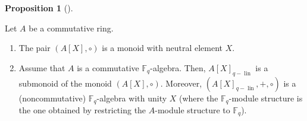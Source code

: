 \documentclass[numbers=enddot,12pt,final,onecolumn,notitlepage]{scrartcl}%
\theoremstyle{definition}
\newtheorem{prop}[theo]{Proposition}
\newenvironment{proposition}[1][]
{\begin{prop}[#1]\begin{leftbar}}
{\end{leftbar}\end{prop}}
\begin{document}
\begin{proposition}
\label{prop.q-pol.comp.basics}Let $A$ be a commutative ring.

\begin{enumerate}
\item[\textbf{(a)}] The pair $\left(  A\left[  X\right]  ,\circ\right)  $ is a
monoid with neutral element $X$.

\item[\textbf{(b)}] Assume that $A$ is a commutative $\mathbb{F}_{q}$-algebra.
Then, $A\left[  X\right]  _{q-\operatorname*{lin}}$ is a submonoid of the
monoid $\left(  A\left[  X\right]  ,\circ\right)  $. Moreover, $\left(
A\left[  X\right]  _{q-\operatorname*{lin}},+,\circ\right)  $ is a
(noncommutative) $\mathbb{F}_{q}$-algebra with unity $X$ (where the
$\mathbb{F}_{q}$-module structure is the one obtained by restricting the
$A$-module structure to $\mathbb{F}_{q}$).
\end{enumerate}
\end{proposition}
\end{document}

